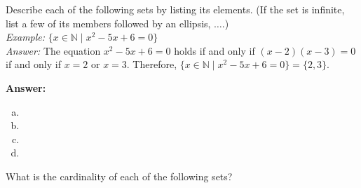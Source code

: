 \documentclass[addpoints,12pt]{exam}
\theoremstyle{remark}
\newcommand{\R}{\ensuremath{\mathbb R}}
\newcommand{\N}{\ensuremath{\mathbb N}}
\newcommand{\conj}{\ensuremath{\wedge}}
\begin{document}
\begin{questions}
  \newpage

  \question[4] %
  Describe each of the following sets by listing its elements.
  (If the set is infinite, list a few of its members followed by an ellipsis, $\dots$.)
  \\[8pt]
  {\it Example:} $\{x\in \N \mid  x^2-5x+6=0\}$
  \\[8pt]
  {\it Answer:} 
  The equation $x^2-5x+6=0$ holds if and only if $(x-2)(x-3) = 0$ 
  if and only if $x=2$ or $x=3$. Therefore,  
  $\{ x\in \N \mid  x^2-5x+6=0\} = \{2, 3\}$.
  \\

  {\bf Answer:} 
  \begin{enumerate}[(a)]
  \item
  \item
    \vskip3cm
  \item
    \vskip3cm
  \item
    \vskip3cm
  \end{enumerate}

  \newpage

  \question[5] %
  What is the cardinality of each of the following sets?
  \begin{parts}

\end{parts}
\end{questions}
\end{document}
